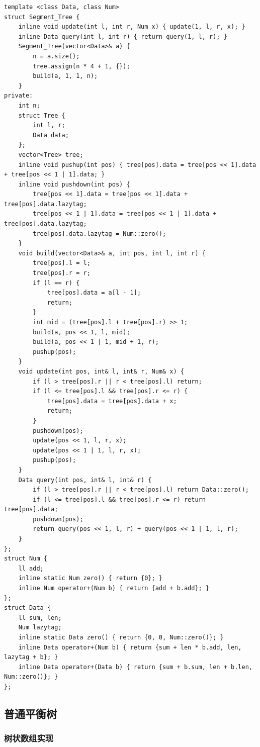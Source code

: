 \documentclass[UTF8, twoside]{ctexart}
\begin{document}
\begin{sloppypar}
\begin{lstlisting}[style=cpp]
template <class Data, class Num>
struct Segment_Tree {
    inline void update(int l, int r, Num x) { update(1, l, r, x); }
    inline Data query(int l, int r) { return query(1, l, r); }
    Segment_Tree(vector<Data>& a) {
        n = a.size();
        tree.assign(n * 4 + 1, {});
        build(a, 1, 1, n);
    }
private:
    int n;
    struct Tree {
        int l, r;
        Data data;
    };
    vector<Tree> tree;
    inline void pushup(int pos) { tree[pos].data = tree[pos << 1].data + tree[pos << 1 | 1].data; }
    inline void pushdown(int pos) {
        tree[pos << 1].data = tree[pos << 1].data + tree[pos].data.lazytag;
        tree[pos << 1 | 1].data = tree[pos << 1 | 1].data + tree[pos].data.lazytag;
        tree[pos].data.lazytag = Num::zero();
    }
    void build(vector<Data>& a, int pos, int l, int r) {
        tree[pos].l = l;
        tree[pos].r = r;
        if (l == r) {
            tree[pos].data = a[l - 1];
            return;
        }
        int mid = (tree[pos].l + tree[pos].r) >> 1;
        build(a, pos << 1, l, mid);
        build(a, pos << 1 | 1, mid + 1, r);
        pushup(pos);
    }
    void update(int pos, int& l, int& r, Num& x) {
        if (l > tree[pos].r || r < tree[pos].l) return;
        if (l <= tree[pos].l && tree[pos].r <= r) {
            tree[pos].data = tree[pos].data + x;
            return;
        }
        pushdown(pos);
        update(pos << 1, l, r, x);
        update(pos << 1 | 1, l, r, x);
        pushup(pos);
    }
    Data query(int pos, int& l, int& r) {
        if (l > tree[pos].r || r < tree[pos].l) return Data::zero();
        if (l <= tree[pos].l && tree[pos].r <= r) return tree[pos].data;
        pushdown(pos);
        return query(pos << 1, l, r) + query(pos << 1 | 1, l, r);
    }
};
struct Num {
    ll add;
    inline static Num zero() { return {0}; }
    inline Num operator+(Num b) { return {add + b.add}; }
};
struct Data {
    ll sum, len;
    Num lazytag;
    inline static Data zero() { return {0, 0, Num::zero()}; }
    inline Data operator+(Num b) { return {sum + len * b.add, len, lazytag + b}; }
    inline Data operator+(Data b) { return {sum + b.sum, len + b.len, Num::zero()}; }
};
\end{lstlisting}
\subsection{普通平衡树}

\subsubsection{树状数组实现}
    

\end{sloppypar}
\end{document}
